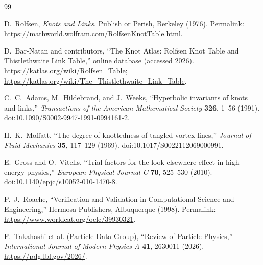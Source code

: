 \begin{thebibliography}{99}

D.~Rolfsen,
\emph{Knots and Links},
Publish or Perish, Berkeley (1976).
Permalink: \url{https://mathworld.wolfram.com/RolfsenKnotTable.html}.

D.~Bar-Natan and contributors,
``The Knot Atlas: Rolfsen Knot Table and Thistlethwaite Link Table,''
online database (accessed 2026).
\url{https://katlas.org/wiki/Rolfsen_Table};
\url{https://katlas.org/wiki/The_Thistlethwaite_Link_Table}.

C.~C.~Adams, M.~Hildebrand, and J.~Weeks,
``Hyperbolic invariants of knots and links,''
\emph{Transactions of the American Mathematical Society}
\textbf{326}, 1--56 (1991).
doi:10.1090/S0002-9947-1991-0994161-2.

H.~K.~Moffatt,
``The degree of knottedness of tangled vortex lines,''
\emph{Journal of Fluid Mechanics} \textbf{35}, 117--129 (1969).
doi:10.1017/S0022112069000991.

E.~Gross and O.~Vitells,
``Trial factors for the look elsewhere effect in high energy physics,''
\emph{European Physical Journal C} \textbf{70}, 525--530 (2010).
doi:10.1140/epjc/s10052-010-1470-8.

P.~J.~Roache,
``Verification and Validation in Computational Science and Engineering,''
Hermosa Publishers, Albuquerque (1998).
Permalink: \url{https://www.worldcat.org/oclc/39930321}.

F.~Takahashi et al. (Particle Data Group),
``Review of Particle Physics,''
\emph{International Journal of Modern Physics A} \textbf{41}, 2630011 (2026).
\url{https://pdg.lbl.gov/2026/}.

\end{thebibliography}

